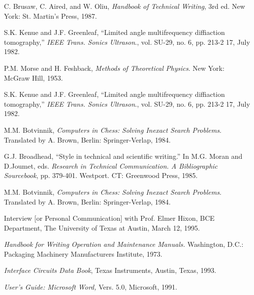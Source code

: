 
 


{
	
}
{

\begin{thebibliography}{}

C. Brusaw, C. Aired, and W. Oliu, \emph{Handbook of Technical Writing}, 3rd ed. New York: St. Martin’s Press, 1987.

S.K. Kenue and J.F. Greenleaf, “Limited angle multifrequency diffiaction tomography,” \emph{IEEE Trans. Sonics Ultrason}., vol. SU-29, no. 6, pp. 213-2 17, July 1982.

P.M. Morse and H. Feshback, \emph{Methods of Theoretical Physics}. New York: McGraw Hill, 1953.

S.K. Kenue and J.F. Greenleaf, “Limited angle multifrequency diffiaction tomography,” \emph{IEEE Trans. Sonics Ultrason}., vol. SU-29, no. 6, pp. 213-2 17, July 1982.


M.M. Botvinnik, \emph{Computers in Chess: Solving Inexact Search Problems}. Translated by A. Brown, Berlin: Springer-Verlap, 1984.

G.J. Broadhead, “Style in technical and scientific writing.” In M.G. Moran and D.Joumet, eds. \emph{Research in Technical Communication. A Bibliographic Sourcebook}, pp. 379-401. Westport. CT: Greenwood Press, 1985.

M.M. Botvinnik, \emph{Computers in Chess: Solving Inexact Search Problems}. Translated by A. Brown, Berlin: Springer-Verlap, 1984.

Interview [or Personal Communication] with Prof. Elmer Hixon, BCE Department, The University of Texas at Austin, March 12, 1995.

\emph{Handbook for Writing Operation and Maintenance Manuals.} Washington, D.C.: Packaging Machinery Manufacturers Institute, 1973.

\emph{Interface Circuits Data Book}, Texas Instruments, Austin, Texas, 1993.

\emph{User’s Guide: Microsoft Word,} Vers. 5.0, Microsoft, 1991.


\end{thebibliography}}
